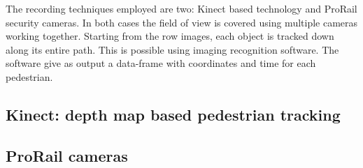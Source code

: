 \documentclass[class=article, crop=false]{standalone}
\begin{document}
The recording techniques employed are two: Kinect based technology and ProRail security cameras.
In both cases the field of view is covered using multiple cameras working together.
Starting from the row images, each object is tracked down along its entire path.
This is possible using imaging recognition software.
The software give as output a data-frame with coordinates and time for each pedestrian.

\subsection{Kinect: depth map based pedestrian tracking}


\subsection{ProRail cameras}
\end{document}
